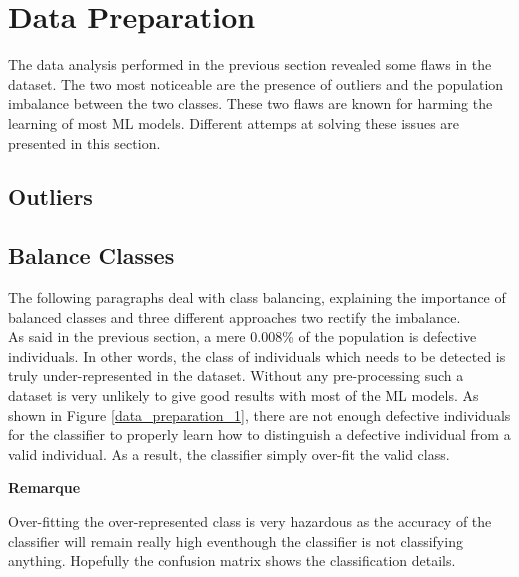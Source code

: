 \section{Data Preparation}
The data analysis performed in the previous section revealed some flaws in the dataset. The two most noticeable are the presence of outliers and the population imbalance between the two classes. These two flaws are known for harming the learning of most ML models. Different attemps at solving these issues are presented in this section.

\subsection{Outliers}

\subsection{Balance Classes}
\label{balance_classes}
The following paragraphs deal with class balancing, explaining the importance of balanced classes and three different approaches two rectify the imbalance.\\

As said in the previous section, a mere 0.008\% of the population is defective individuals. In other words, the class of individuals which needs to be detected is truly under-represented in the dataset.
Without any pre-processing such a dataset is very unlikely to give good results with most of the ML models. As shown in Figure \ref{data_preparation_1}, there are not enough defective individuals for the classifier to properly learn how to distinguish a defective individual from a valid individual. As a result, the classifier simply over-fit the valid class.\\

\noindent
\begin{minipage}[!hc]{0.12\textwidth}
   \textbf{Remarque}
\end{minipage}
\vrule\enskip\vrule\quad\begin{minipage}{\dimexpr 0.87\textwidth-0.8pt-1.5em}
Over-fitting the over-represented class is very hazardous as the accuracy of the classifier will remain really high eventhough the classifier is not classifying anything. Hopefully the confusion matrix shows the classification details.
\end{minipage}\\

